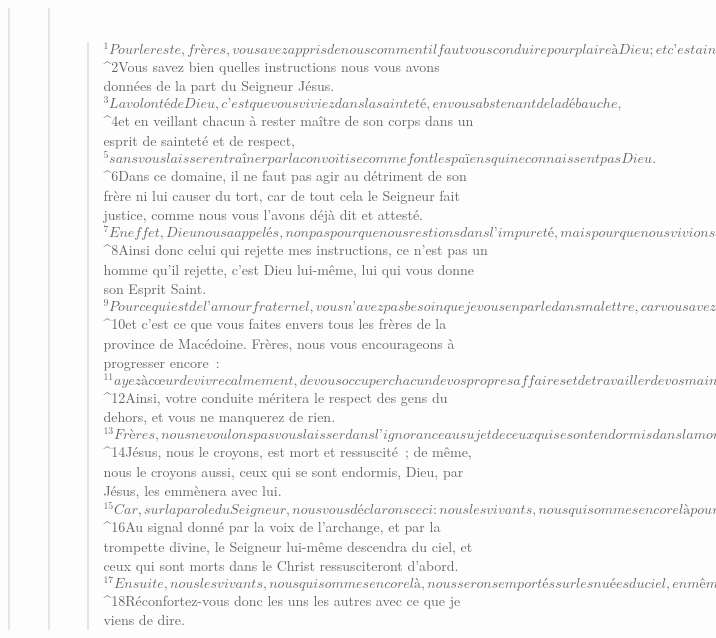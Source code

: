 \begin{verse}
\begin{verse}
         
      \bchapter{}
      \begin{verse}
${}^{1}Pour le reste, frères, vous avez appris de nous comment il faut vous conduire pour plaire à Dieu ; et c’est ainsi que vous vous conduisez déjà. Faites donc de nouveaux progrès, nous vous le demandons, oui, nous vous en prions dans le Seigneur Jésus. 
${}^{2}Vous savez bien quelles instructions nous vous avons données de la part du Seigneur Jésus.
${}^{3}La volonté de Dieu, c’est que vous viviez dans la sainteté, en vous abstenant de la débauche, 
${}^{4}et en veillant chacun à rester maître de son corps dans un esprit de sainteté et de respect, 
${}^{5}sans vous laisser entraîner par la convoitise comme font les païens qui ne connaissent pas Dieu. 
${}^{6}Dans ce domaine, il ne faut pas agir au détriment de son frère ni lui causer du tort, car de tout cela le Seigneur fait justice, comme nous vous l’avons déjà dit et attesté. 
${}^{7}En effet, Dieu nous a appelés, non pas pour que nous restions dans l’impureté, mais pour que nous vivions dans la sainteté. 
${}^{8}Ainsi donc celui qui rejette mes instructions, ce n’est pas un homme qu’il rejette, c’est Dieu lui-même, lui qui vous donne son Esprit Saint.
${}^{9}Pour ce qui est de l’amour fraternel, vous n’avez pas besoin que je vous en parle dans ma lettre, car vous avez appris vous-mêmes de Dieu à vous aimer les uns les autres, 
${}^{10}et c’est ce que vous faites envers tous les frères de la province de Macédoine. Frères, nous vous encourageons à progresser encore : 
${}^{11}ayez à cœur de vivre calmement, de vous occuper chacun de vos propres affaires et de travailler de vos mains comme nous vous l’avons ordonné. 
${}^{12}Ainsi, votre conduite méritera le respect des gens du dehors, et vous ne manquerez de rien.
${}^{13}Frères, nous ne voulons pas vous laisser dans l’ignorance au sujet de ceux qui se sont endormis dans la mort ; il ne faut pas que vous soyez abattus comme les autres, qui n’ont pas d’espérance. 
${}^{14}Jésus, nous le croyons, est mort et ressuscité ; de même, nous le croyons aussi, ceux qui se sont endormis, Dieu, par Jésus, les emmènera avec lui. 
${}^{15}Car, sur la parole du Seigneur, nous vous déclarons ceci : nous les vivants, nous qui sommes encore là pour la venue du Seigneur, nous ne devancerons pas ceux qui se sont endormis. 
${}^{16}Au signal donné par la voix de l’archange, et par la trompette divine, le Seigneur lui-même descendra du ciel, et ceux qui sont morts dans le Christ ressusciteront d’abord. 
${}^{17}Ensuite, nous les vivants, nous qui sommes encore là, nous serons emportés sur les nuées du ciel, en même temps qu’eux, à la rencontre du Seigneur. Ainsi, nous serons pour toujours avec le Seigneur. 
${}^{18}Réconfortez-vous donc les uns les autres avec ce que je viens de dire.
      

\end{verse}
\end{verse}
\end{verse}
